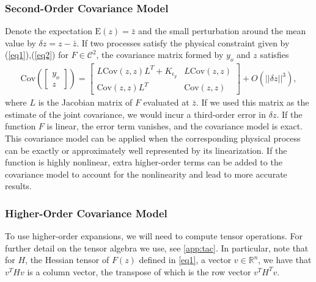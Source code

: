 \documentclass[article,ij4uq]{ij4uq}              %
\begin{document}
\subsubsection{Second-Order Covariance Model}
\par Denote the expectation $\mathrm{E}(z)=\bar{z}$ and the small perturbation around the mean value by $\delta z=z-\bar{z}$. If two processes satisfy the physical constraint given by (\ref{eq1}),(\ref{eq2}) for $F\in \mathcal{C}^{2}$, the covariance matrix formed by $y_{o}$ and $z$ satisfies
\begin{align}
    \mathrm{Cov}\left( \begin{bmatrix}y_{o}\\z\end{bmatrix} \right)=\begin{bmatrix}L\mathrm{Cov}(z,z)L^{T}+K_{\epsilon_{y}} & L\mathrm{Cov}(z,z)\\\mathrm{Cov}(z,z)L^{T} & \mathrm{Cov}(z,z)\end{bmatrix}+O(||\delta z||^{3}),\label{eq4}
\end{align}
where $L$ is the Jacobian matrix of $F$ evaluated at $\bar{z}$. If we used this matrix  as the estimate of the joint covariance, we would incur a third-order error in $\delta z$. If the function $F$ is linear, the error term vanishes, and the covariance model is exact. This covariance model can be applied when the corresponding physical process can be exactly or approximately well represented by its linearization. If the function is highly nonlinear, extra higher-order terms can be added to the covariance model to account for the nonlinearity and lead to more accurate results. 

\subsubsection{Higher-Order Covariance Model}
\par To use higher-order expansions, we will need to compute tensor operations. For further detail on the tensor algebra we use, see \ref{app:tac}. In particular, note that for $H$, the Hessian tensor of $F(z)$ defined in \eqref{eq1}, a vector $v \in \mathbb{R}^n$, we have that $v^T H v$ is a column vector, the transpose of which is the row vector				
$v^T H^T v$.
\end{document}
